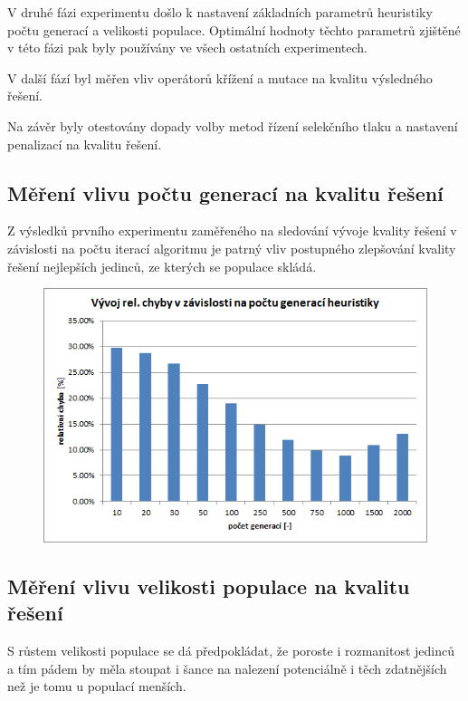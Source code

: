 \documentclass[12pt,oneside,a4paper]{article}
\begin{document}
V druhé fázi experimentu došlo k nastavení základních parametrů heuristiky počtu generací a velikosti populace. Optimální hodnoty těchto parametrů zjištěné v této fázi pak byly používány ve všech ostatních experimentech.

V další fází byl měřen vliv operátorů křížení a mutace na kvalitu výsledného řešení.

Na závěr byly otestovány dopady volby metod řízení selekčního tlaku a nastavení penalizací na kvalitu řešení.


\subsection{Měření vlivu počtu generací na kvalitu řešení}

Z výsledků prvního experimentu zaměřeného na sledování vývoje kvality řešení v závislosti na počtu iterací algoritmu je patrný vliv postupného zlepšování kvality řešení nejlepších jedinců, ze kterých se populace skládá.

\begin{figure}[ht]
\centering
\includegraphics[scale=0.9]{obr/gen.png}
\end{figure}

\newpage
\FloatBarrier

\subsection{Měření vlivu velikosti populace na kvalitu řešení}

S růstem velikosti populace se dá předpokládat, že poroste i rozmanitost jedinců a tím pádem by měla stoupat i šance na nalezení potenciálně i těch zdatnějších než je tomu u populací menších.
\end{document}
